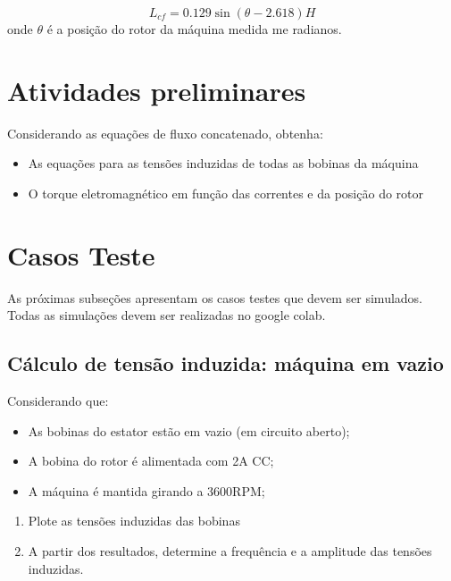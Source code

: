 \documentclass[a4paper]{article}
\theoremstyle{definition}
\theoremstyle{plain}
\begin{document}
\begin{equation}
L_{cf} = 0.129 \sin(\theta -2.618) H
\end{equation}
%
onde $\theta$ é a posição do rotor da máquina medida me radianos.

\section{Atividades preliminares}

Considerando as equações de fluxo concatenado, obtenha:

\begin{itemize}
\item As equações para as tensões induzidas de todas as bobinas da máquina
\item O torque eletromagnético em função das correntes e da posição do rotor
\end{itemize}


\section{Casos Teste}

As próximas subseções apresentam os casos testes que devem ser simulados. Todas as simulações devem ser realizadas no google colab.



\subsection{Cálculo de tensão induzida: máquina em vazio}

Considerando que:

\begin{itemize}
\item As bobinas do estator estão em vazio (em circuito aberto);
\item A bobina do rotor é alimentada com 2A CC;
\item A máquina é mantida girando a 3600RPM;
\end{itemize}



\begin{enumerate}
\item Plote as tensões induzidas das bobinas
\item A partir dos resultados, determine a frequência e a amplitude das tensões induzidas.
\end{enumerate}
\end{document}
